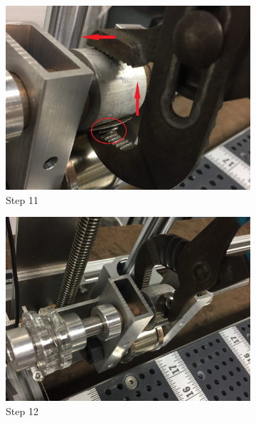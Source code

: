 \documentclass[titlepage,12pt,letter]{report}
\numberwithin{equation}{chapter}
\begin{document}
\begin{enumerate}[noitemsep,topsep=0pt]
\begin{figure}[H]
\begin{subfigure}[b]{.475\textwidth}
		\includegraphics[width=\textwidth]{./Figures/Wire_mounting/11.jpg}
		\caption{Step 11}
	\end{subfigure}
	\begin{subfigure}[b]{.475\textwidth}
		\centering
		\includegraphics[width=\textwidth]{./Figures/Wire_mounting/12.jpg}
		\caption{Step 12}
	\end{subfigure}	
	\centering
	\begin{subfigure}[b]{.475\textwidth}
		\centering

\end{subfigure}
\end{figure}
\end{enumerate}
\end{document}

